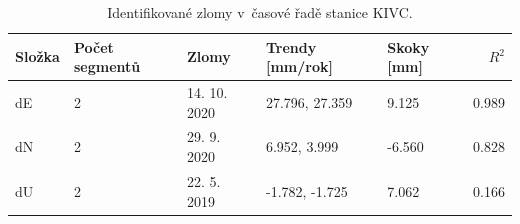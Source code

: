 \begin{table}[H]
\centering
\small
\caption{Identifikované zlomy v~časové řadě stanice KIVC.}
\label{tab:gop25wd04_stcd_kivc_trend_weighted_multiseg}
\begin{tabular}{lllllr}
\toprule
Složka & Počet segmentů & Zlomy & Trendy [mm/rok] & Skoky [mm] & $R^2$ \\
\midrule
dE & 2 & 14. 10. 2020 & 27.796, 27.359 & 9.125 & 0.989 \\
dN & 2 & 29. 9. 2020 & 6.952, 3.999 & -6.560 & 0.828 \\
dU & 2 & 22. 5. 2019 & -1.782, -1.725 & 7.062 & 0.166 \\
\bottomrule
\end{tabular}
\end{table}
